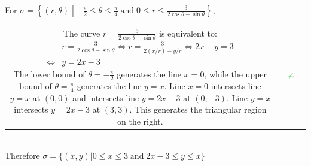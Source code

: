 \documentclass{article}
\newcommand{\dr}[1]{\textcolor{dark_red}{#1}}
\begin{document}
\dr{\begin{framed}
For \(\sigma = \left\{(r,\theta) \middle| -\frac{\pi}{2} \leq \theta \leq \frac{\pi}{4} \;\text{and}\; 0 \leq r \leq \frac{3}{2\cos\theta - \sin\theta}\right\}\), \\
\begin{tabular}{cc}
\parbox{0.6\textwidth}{
The curve \(r = \frac{3}{2\cos\theta - \sin\theta}\) is equivalent to: 
\begin{align*}
& r = \frac{3}{2\cos\theta - \sin\theta} 
\iff r = \frac{3}{2(x/r) - y/r} 
\iff 2x - y = 3 \\
\iff &  y = 2x - 3
\end{align*}
The lower bound of \(\theta = -\frac{\pi}{2}\) generates the line \(x = 0\), while the upper bound of \(\theta = \frac{\pi}{4}\) generates the line \(y = x\). Line \(x = 0\) intersects line \(y = x\) at \((0,0)\) and intersects line \(y = 2x - 3\) at \((0,-3)\). Line \(y = x\) intersects \(y = 2x - 3\) at \((3,3)\). This generates the triangular region on the right.
} & \parbox{0.4\textwidth}{
\includegraphics[width = 0.3\textwidth]{Test_bench_part_3x_images/Test_bench_part_3x_Solutions_image_8}
}
\end{tabular} \\
Therefore \(\sigma = \{(x,y) | 0 \leq x \leq 3 \;\text{and}\; 2x - 3 \leq y \leq x\}\)
\end{framed}}
\end{document}
